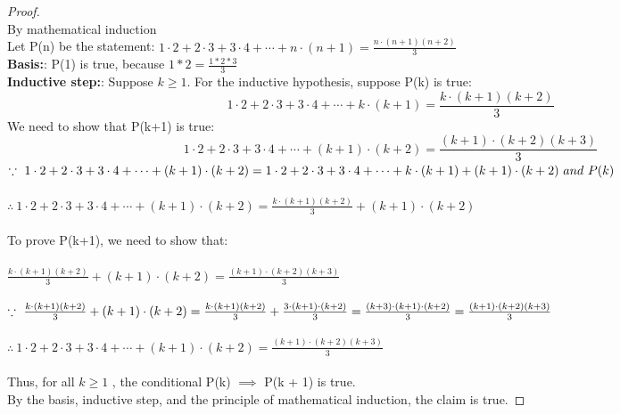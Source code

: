 \documentclass[paper=a4, fontsize=11pt]{scrartcl} %
\numberwithin{equation}{section} %
\numberwithin{figure}{section} %
\numberwithin{table}{section} %
\newcommand{\basis}{\textbf{Basis:}: }
\newcommand{\inductiveStep}{\textbf{Inductive step:}: }
\newcommand{\pnl}{$ $\newline\\}
\begin{document}
\begin{proof}
\pnl
By mathematical induction\\
Let P(n) be the statement: $1\cdot2+2\cdot3+3\cdot4+\cdots+n\cdot(n+1)=\frac{n\cdot(n+1)(n+2)}{3}$\\
\basis P(1) is true, because $1*2 = \frac{1*2*3}{3}$\\
\inductiveStep Suppose $k \geq 1$. For the inductive hypothesis, suppose P(k) is true: \\
$$1\cdot2+2\cdot3+3\cdot4+\cdots+k\cdot(k+1)=\frac{k\cdot(k+1)(k+2)}{3}$$
We need to show that P(k+1) is true:
$$1\cdot2+2\cdot3+3\cdot4+\cdots+(k+1)\cdot(k+2)=\frac{(k+1)\cdot(k+2)(k+3)}{3}$$
$\because \ 1\cdot2+2\cdot3+3\cdot4+\cdots+(k+1)\cdot(k+2) \\= 1\cdot2+2\cdot3+3\cdot4+\cdots+k\cdot(k+1)+(k+1)\cdot(k+2) \ and \ P(k)$\\\\
$\therefore \ 1\cdot2+2\cdot3+3\cdot4+\cdots+(k+1)\cdot(k+2) = \frac{k\cdot(k+1)(k+2)}{3} + (k+1)\cdot(k+2)$\\\\
To prove P(k+1), we need to show that:\\\\
$\frac{k\cdot(k+1)(k+2)}{3} + (k+1)\cdot(k+2) = \frac{(k+1)\cdot(k+2)(k+3)}{3}$\\\\
$\because \ \frac{k\cdot(k+1)(k+2)}{3} + (k+1)\cdot(k+2) = \frac{k\cdot(k+1)(k+2)}{3} + \frac{3\cdot(k+1)\cdot(k+2)}{3} = \frac{(k+3)\cdot(k+1)\cdot(k+2)}{3} \\\\
=\frac{(k+1)\cdot(k+2)(k+3)}{3}$\\\\
$\therefore \ 1\cdot2+2\cdot3+3\cdot4+\cdots+(k+1)\cdot(k+2)=\frac{(k+1)\cdot(k+2)(k+3)}{3}$\\\\
Thus, for all $k \geq 1$ , the conditional P(k) $\implies$ P(k + 1) is true.\\
By the basis, inductive step, and the principle of mathematical induction, the claim is true.
\end{proof}
\end{document}
